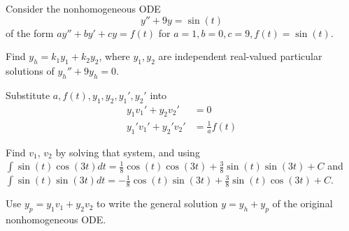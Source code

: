 \begin{applicationActivities}
\begin{activity}{20}
Consider the nonhomogeneous ODE \[y''+9y=\sin(t)\] of the
form \(ay''+by'+cy=f(t)\) for \(a=1,b=0,c=9,f(t)=\sin(t)\).
\vfill
\begin{subactivity}
Find \(y_h=k_1y_1+k_2y_2\), where \(y_1,y_2\) are
independent real-valued particular
solutions of \(y_h''+9y_h=0\).
\end{subactivity}
\begin{subactivity}
Substitute \(a,f(t),y_1,y_2,y_1',y_2'\) into
\begin{alignat*}{2}
y_1 v_1' + y_2 v_2'&=0 \\
y_1' v_1' + y_2' v_2'&=\frac{1}{a}f(t) 
\end{alignat*}
\end{subactivity}
\begin{subactivity}
Find \(v_1\), \(v_2\) by solving that system, and using
\(\int\sin(t)\cos(3t)dt=\frac{1}{8}\cos(t)\cos(3t)+\frac{3}{8}\sin(t)\sin(3t)+C\) and
\(\int\sin(t)\sin(3t)dt=-\frac{1}{8}\cos(t)\sin(3t)+\frac{3}{8}\sin(t)\cos(3t)+C\).
\end{subactivity}
\begin{subactivity}
Use \(y_p=y_1v_1+y_2v_2\) to write the general solution \(y=y_h+y_p\) 
of the original nonhomogeneous ODE.
\end{subactivity}
\end{activity}


\end{applicationActivities}
